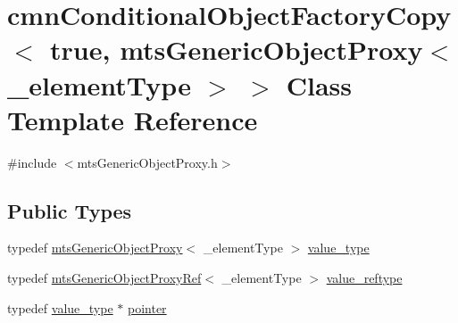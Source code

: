 \hypertarget{classcmn_conditional_object_factory_copy_3_01true_00_01mts_generic_object_proxy_3_01__element_type_01_4_01_4}{}\section{cmn\+Conditional\+Object\+Factory\+Copy$<$ true, mts\+Generic\+Object\+Proxy$<$ \+\_\+element\+Type $>$ $>$ Class Template Reference}
\label{classcmn_conditional_object_factory_copy_3_01true_00_01mts_generic_object_proxy_3_01__element_type_01_4_01_4}


{\ttfamily \#include $<$mts\+Generic\+Object\+Proxy.\+h$>$}

\subsection*{Public Types}
\begin{DoxyCompactItemize}
\item 
typedef \hyperlink{classmts_generic_object_proxy}{mts\+Generic\+Object\+Proxy}$<$ \+\_\+element\+Type $>$ \hyperlink{classcmn_conditional_object_factory_copy_3_01true_00_01mts_generic_object_proxy_3_01__element_type_01_4_01_4_a206702e54ea83f096833f3e28fe87a7d}{value\+\_\+type}
\item 
typedef \hyperlink{classmts_generic_object_proxy_ref}{mts\+Generic\+Object\+Proxy\+Ref}$<$ \+\_\+element\+Type $>$ \hyperlink{classcmn_conditional_object_factory_copy_3_01true_00_01mts_generic_object_proxy_3_01__element_type_01_4_01_4_ae3b76e4662e4828ea5f57f42bb46a35b}{value\+\_\+reftype}
\item 
typedef \hyperlink{classcmn_conditional_object_factory_copy_3_01true_00_01mts_generic_object_proxy_3_01__element_type_01_4_01_4_a206702e54ea83f096833f3e28fe87a7d}{value\+\_\+type} $\ast$ \hyperlink{classcmn_conditional_object_factory_copy_3_01true_00_01mts_generic_object_proxy_3_01__element_type_01_4_01_4_a00518536863dfeebbba5ece74e4b2303}{pointer}
\end{DoxyCompactItemize}
